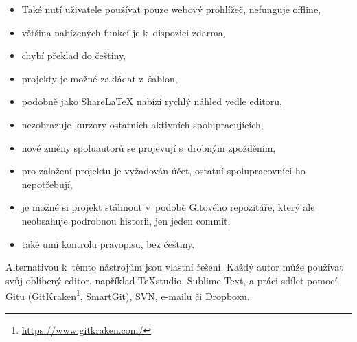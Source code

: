 \begin{itemize}
	\item Také nutí uživatele používat pouze webový prohlížeč, nefunguje offline,
	\item většina nabízených funkcí je k~dispozici zdarma,
	\item chybí překlad do češtiny,
	\item projekty je možné zakládat z~šablon,
	\item podobně jako ShareLaTeX nabízí rychlý náhled vedle editoru,
	\item nezobrazuje kurzory ostatních aktivních spolupracujících,
	\item nové změny spoluautorů se projevují s~drobným zpožděním,
	\item pro založení projektu je vyžadován účet, ostatní spolupracovníci ho nepotřebují,
	\item je možné si projekt stáhnout v~podobě Gitového repozitáře, který ale neobsahuje podrobnou historii, jen jeden commit,
	\item také umí kontrolu pravopisu, bez češtiny.
\end{itemize}

Alternativou k~těmto nástrojům jsou vlastní řešení. Každý autor může používat svůj oblíbený editor, například TeXstudio, Sublime Text, a práci sdílet pomocí Gitu (GitKraken\footnote{\url{https://www.gitkraken.com/}}, SmartGit), SVN, e-mailu či Dropboxu.